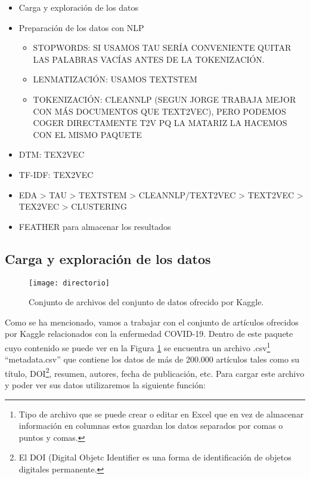 \documentclass[10pt, a4paper]{article}
\begin{document}
\begin{itemize}
  \item Carga y exploración de los datos
  
  \item Preparación de los datos con NLP
  
  \begin{itemize}
  
    \item STOPWORDS: SI USAMOS TAU SERÍA CONVENIENTE QUITAR LAS PALABRAS VACÍAS ANTES DE LA TOKENIZACIÓN. 
  
    \item LENMATIZACIÓN: USAMOS TEXTSTEM
  
    \item TOKENIZACIÓN: CLEANNLP (SEGUN JORGE TRABAJA MEJOR CON MÁS DOCUMENTOS QUE TEXT2VEC), PERO PODEMOS COGER DIRECTAMENTE T2V PQ LA MATARIZ LA HACEMOS CON EL MISMO PAQUETE
  \end{itemize}
  
  \item DTM: TEX2VEC

  \item TF-IDF: TEX2VEC
  
  \item EDA > TAU > TEXTSTEM > CLEANNLP/TEXT2VEC > TEXT2VEC > TEX2VEC > CLUSTERING

  \item FEATHER para almacenar los resultados

\end{itemize}


\subsection{Carga y exploración de los datos}

\begin{figure}[ht]
\centering
\texttt{[image: directorio]}
\caption{Conjunto de archivos del conjunto de datos ofrecido por Kaggle.}
\label{fig:directorio}
\end{figure}

Como se ha mencionado, vamos a trabajar con el conjunto de artículos ofrecidos por Kaggle relacionados con la enfermedad COVID-19. Dentro de este paquete cuyo contenido se puede ver en la Figura \ref{fig:directorio} se encuentra un archivo .csv\footnote{Tipo de archivo que se puede crear o editar en Excel que en vez de almacenar información en columnas estos guardan los datos separados por comas o puntos y comas.} ``metadata.csv'' que contiene los datos de más de 200.000 artículos tales como su título, DOI\footnote{El DOI (Digital Objetc Identifier es una forma de identificación de objetos digitales permanente.}, resumen, autores, fecha de publicación, etc. Para cargar este archivo y poder ver sus datos utilizaremos la siguiente función:
\end{document}
